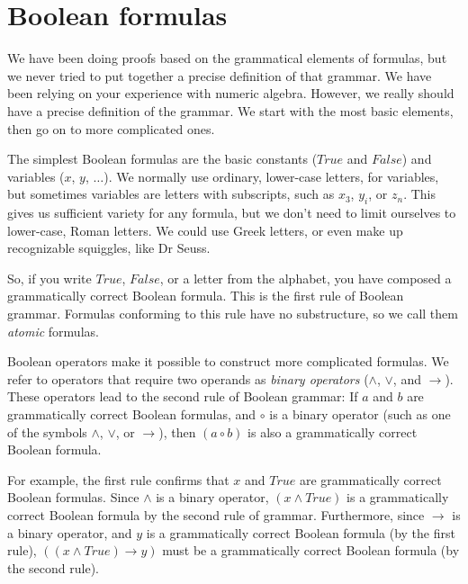 \section{Boolean formulas}
\label{sec:boolean-formuas}

We have been doing proofs based on the grammatical elements of formulas,
but we never tried to put together a precise definition of that grammar.
We have been relying on your experience with numeric algebra.
However, we really should have a precise definition of the grammar.
We start with the most basic elements,
then go on to more complicated ones.

The simplest Boolean formulas are the basic constants ($True$ and $False$)
and variables ($x$, $y$, $\dots$).
We normally use ordinary, lower-case letters,
for variables,
but sometimes variables are letters with subscripts,
such as $x_3$, $y_i$, or $z_n$.
This gives us sufficient variety for any formula,
but we don't need to limit ourselves to lower-case, Roman letters.
We could use Greek letters, or
even make up recognizable squiggles, like
Dr Seuss.

So, if you write $True$, $False$, or a letter from the alphabet,
you have composed a grammatically correct Boolean formula.
This is the first rule of Boolean grammar.
Formulas conforming to this rule have no substructure,
so we call them
\emph{atomic} formulas.

Boolean operators make it possible to construct more complicated formulas.
We refer to operators that require two operands as \emph{binary operators }
($\wedge$, $\vee$, and $\rightarrow$).
These operators lead to the second rule of Boolean grammar:
If $a$ and $b$ are grammatically correct Boolean formulas,
and $\circ$ is a binary operator
(such as one of the symbols $\wedge$, $\vee$, or $\rightarrow$),
then $(a \circ b)$ is also a grammatically correct Boolean formula.

For example, the first rule confirms that $x$ and $True$ are
grammatically correct Boolean formulas. Since $\wedge$ is a binary operator,
$(x \wedge True)$ is a grammatically correct Boolean formula by the
second rule of grammar. Furthermore, since $\rightarrow$ is a binary operator,
and $y$ is a grammatically correct Boolean formula (by the first rule),
$((x \wedge True) \rightarrow y)$ must be a grammatically correct
Boolean formula (by the second rule).

